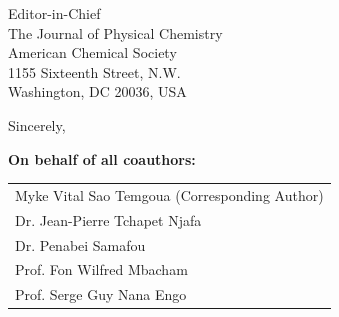 \documentclass[11pt]{letter}
\begin{document}
\begin{letter}{%
    Editor-in-Chief \\
    The Journal of Physical Chemistry \\
    American Chemical Society \\
    1155 Sixteenth Street, N.W. \\
    Washington, DC 20036, USA
}
\closing{Sincerely,}

\vspace{1cm}

\noindent
\textbf{On behalf of all coauthors:}

\begin{tabular}{@{}l}
Myke Vital Sao Temgoua (Corresponding Author) \\
Dr. Jean-Pierre Tchapet Njafa \\
Dr. Penabei Samafou \\
Prof. Fon Wilfred Mbacham \\
Prof. Serge Guy Nana Engo
\end{tabular}

\end{letter}
\end{document}
